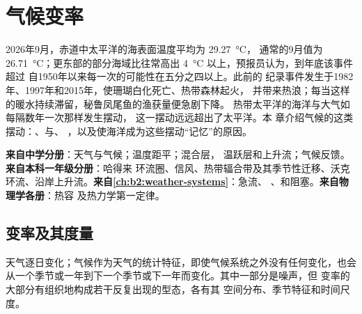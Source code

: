 \chapter{气候变率}\label{ch:b2:climate-variability}

2026年9月，赤道中太平洋的海表面温度平均为 \qty{29.27}{\celsius}，
通常的9月值为 \qty{26.71}{\celsius}；更东部的部分海域比往常高出
\qty{4}{\celsius} 以上，预报员认为，到年底该事件超过
自1950年以来每一次的可能性在五分之四以上。此前的
纪录事件发生于1982年、1997年和2015年，使珊瑚白化死亡、热带森林起火，
并带来热浪；每当这样的暖水持续滞留，秘鲁凤尾鱼的渔获量便急剧下降。
热带太平洋的海洋与大气如每隔数年一次那样发生摆动，
这一摆动远远超出了太平洋。本
章介绍气候的这类摆动：、与、
，以及使海洋成为这些摆动“记忆”的原因。

\begin{recall}
\textbf{来自中学分册}：天气与气候；温度距平；混合层，
温跃层和上升流；气候反馈。\textbf{来自本科一年级分册}：哈得来
环流圈、信风、热带辐合带及其季节性迁移、沃克
环流、沿岸上升流。\textbf{来自\cref{ch:b2:weather-systems}}：急流、
、和阻塞。\textbf{来自物理学各册}：热容
及热力学第一定律。
\end{recall}

\section{变率及其度量}\label{sec:b2:climate-variability:measures}

天气逐日变化；气候作为天气的统计特征，即使气候系统之外没有任何变化，也会
从一个季节或一年到下一个季节或下一年而变化。其中一部分是噪声，但
变率的大部分有组织地构成若干反复出现的型态，各有其
空间分布、季节特征和时间尺度。

